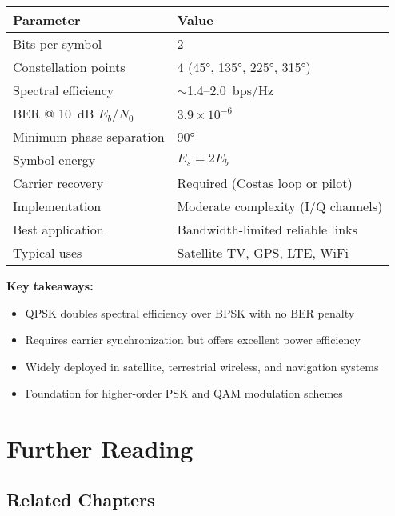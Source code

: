 \begin{center}
\begin{tabular}{@{}ll@{}}
\toprule
\textbf{Parameter} & \textbf{Value} \\
\midrule
Bits per symbol & 2 \\
Constellation points & 4 (45°, 135°, 225°, 315°) \\
Spectral efficiency & $\sim$1.4--2.0~bps/Hz \\
BER @ 10~dB $E_b/N_0$ & $3.9 \times 10^{-6}$ \\
Minimum phase separation & 90° \\
Symbol energy & $E_s = 2E_b$ \\
Carrier recovery & Required (Costas loop or pilot) \\
Implementation & Moderate complexity (I/Q channels) \\
Best application & Bandwidth-limited reliable links \\
Typical uses & Satellite TV, GPS, LTE, WiFi \\
\bottomrule
\end{tabular}
\end{center}

\vspace{10pt}

\textbf{Key takeaways:}
\begin{itemize}
\item QPSK doubles spectral efficiency over BPSK with no BER penalty
\item Requires carrier synchronization but offers excellent power efficiency
\item Widely deployed in satellite, terrestrial wireless, and navigation systems
\item Foundation for higher-order PSK and QAM modulation schemes
\end{itemize}

\section{Further Reading}

\subsection*{Related Chapters}

